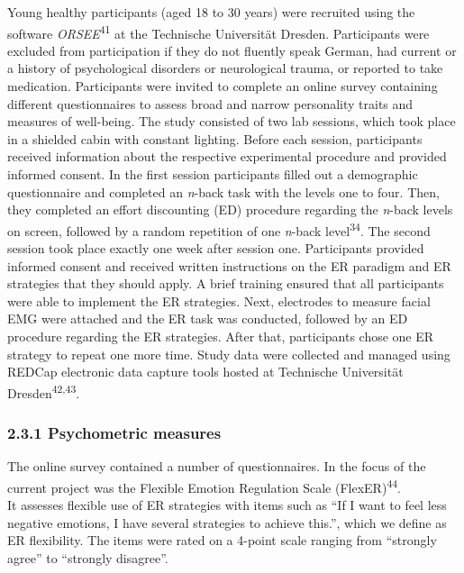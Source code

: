 \documentclass[
  man,floatsintext]{apa6}
\begin{document}
Young healthy participants (aged 18 to 30 years) were recruited using the software \emph{ORSEE}\textsuperscript{41} at the Technische Universität Dresden.
Participants were excluded from participation if they do not fluently speak German, had current or a history of psychological disorders or neurological trauma, or reported to take medication.
Participants were invited to complete an online survey containing different questionnaires to assess broad and narrow personality traits and measures of well-being.
The study consisted of two lab sessions, which took place in a shielded cabin with constant lighting.
Before each session, participants received information about the respective experimental procedure and provided informed consent.
In the first session participants filled out a demographic questionnaire and completed an \emph{n}-back task with the levels one to four.
Then, they completed an effort discounting (ED) procedure regarding the \emph{n}-back levels on screen, followed by a random repetition of one \emph{n}-back level\textsuperscript{34}.
The second session took place exactly one week after session one.
Participants provided informed consent and received written instructions on the ER paradigm and ER strategies that they should apply.
A brief training ensured that all participants were able to implement the ER strategies.
Next, electrodes to measure facial EMG were attached and the ER task was conducted, followed by an ED procedure regarding the ER strategies.
After that, participants chose one ER strategy to repeat one more time.
Study data were collected and managed using REDCap electronic data capture tools hosted at Technische Universität Dresden\textsuperscript{42,43}.

\hypertarget{psychometric-measures}{%
\subsubsection{2.3.1 Psychometric measures}\label{psychometric-measures}}

The online survey contained a number of questionnaires.
In the focus of the current project was the Flexible Emotion Regulation Scale (FlexER)\textsuperscript{44}.\\
It assesses flexible use of ER strategies with items such as ``If I want to feel less negative emotions, I have several strategies to achieve this.'', which we define as ER flexibility.
The items were rated on a 4-point scale ranging from ``strongly agree'' to ``strongly disagree''.
\end{document}
